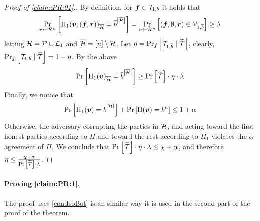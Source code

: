 \begin{proof}[Proof of \cref{claim:PR:01}.]
By definition, for $\vf \in \cT_{1,\o}$ it holds that
\begin{align*}
\ppr{\vr \gets \rn}{\Pi_1(\vv;(\vf,\vr))_\oH  = \oo^{\size{\oH}} } = \ppr{\vr \gets \rn}{(\vf,\emptyset,\vr) \in \cV_{1,\oo} } \ge \lambda
\end{align*}
letting $\cH = \cP \cup \cL_1$ and $\oH = [n] \setminus\cH$.  Let $\eta = \ppr{\vf}{\cT_{1,\oo} \mid \tT}$, clearly,	$\ppr{\vf}{\cT_{1,\o} \mid \tT} = 1 -\eta$. By the above
\begin{align}
\pr{\Pi_1(\vv)_\oH =  \oo^{\size{\oH}}} \ge \pr{\tT}\cdot \eta \cdot \lambda
\end{align}
Finally, we notice  that
\begin{align}
\pr{\Pi_1(\vv) =  \oo^{\size{\cH}}} + \pr{\Pi(\vv) =  \o^n}  \le  1+ \alpha
\end{align}
Otherwise, the adversary corrupting the parties in  $\cH$, and acting toward the first honest parties according to $\Pi$ and toward the rest according to $\Pi_1$ violates the $\alpha$-agreement of $\Pi$. We conclude that $ \pr{\tT}\cdot \eta \cdot \lambda   \le \chi + \alpha $, and therefore $\eta \le \frac{\chi + \alpha }{\pr{\tT}\cdot \lambda}$.
 \end{proof}










\paragraph{Proving \cref{claim:PR:1}.}



The proof uses \cref{con:IsoBot} is an similar way it is used in 	the second part of the proof of the theorem.


